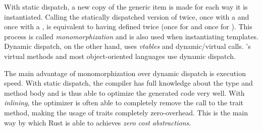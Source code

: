 With static dispatch, a new copy of the generic item is made for each way it is instantiated.
Calling the statically dispatched version of  twice, once with a  and once with a , is equivalent to having defined  twice (once for  and once for ).
This process is called \emph{monomorphization} and is also used when instantiating \cpp templates.
Dynamic dispatch, on the other hand, uses \emph{vtables} and dynamic/virtual calls.
\cpp's virtual methods and most object-oriented languages use dynamic dispatch.

The main advantage of monomorphization over dynamic dispatch is execution speed.
With static dispatch, the compiler has full knowledge about the type and method body and is thus able to optimize the generated code very well.
With \emph{inlining}, the optimizer is often able to completely remove the call to the trait method, making the usage of traits completely zero-overhead.
This is the main way by which Rust is able to achieves \emph{zero cost abstractions}.

